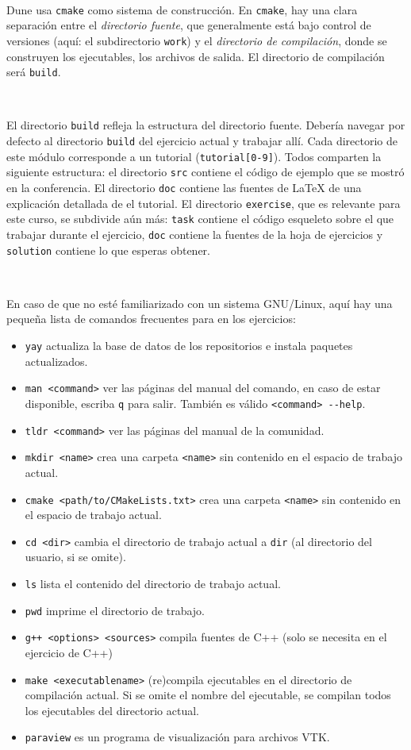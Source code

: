\documentclass[9pt,a3paper]{scrartcl}
\begin{document}
\

Dune usa \verb!cmake! como sistema de construcción.
En \verb!cmake!, hay una clara separación entre el \textit{directorio fuente}, que
generalmente está bajo control de versiones (aquí: el subdirectorio \verb!work!) y el \textit{directorio de compilación}, donde se construyen los ejecutables, los archivos de salida. El directorio de compilación será \verb!build!.

\

El directorio \verb!build! refleja la estructura del directorio fuente.
Debería navegar por defecto al directorio \verb!build! del ejercicio actual y trabajar allí.
Cada directorio de este módulo corresponde a un tutorial (\verb!tutorial[0-9]!).
Todos comparten la siguiente estructura: el directorio \verb!src! contiene el
código de ejemplo que se mostró en la conferencia.
El directorio \verb!doc! contiene las fuentes de \LaTeX{} de una explicación detallada de
el tutorial.
El directorio \verb!exercise!, que es relevante para este curso, se subdivide aún más: \verb!task! contiene el código esqueleto sobre el que trabajar durante el ejercicio, \verb!doc! contiene la fuentes de la hoja de ejercicios y \verb!solution! contiene lo que esperas obtener.

\

En caso de que no esté familiarizado con un sistema GNU/Linux, aquí hay una pequeña lista de comandos frecuentes para en los ejercicios:
\begin{itemize}
	\item \verb!yay! actualiza la base de datos de los repositorios e instala paquetes actualizados.

	\item \verb!man <command>! ver las páginas del manual del comando, en caso de estar disponible, escriba \verb!q! para salir. También es válido \verb!<command> --help!.
	\item \verb!tldr <command>! ver las páginas del manual de la comunidad.
	\item \verb!mkdir <name>! crea una carpeta \verb!<name>! sin contenido en el espacio de trabajo actual.
	\item \verb!cmake <path/to/CMakeLists.txt>! crea una carpeta \verb!<name>! sin contenido en el espacio de trabajo actual.
	\item \verb!cd <dir>! cambia el directorio de trabajo actual
	      a \verb!dir! (al directorio del usuario, si se omite).
	\item \verb!ls! lista el contenido del directorio de trabajo actual.
	\item \verb!pwd! imprime el directorio de trabajo.
	\item \verb!g++ <options> <sources>! compila fuentes de C++ (solo se necesita en el ejercicio de C++)
	\item \verb!make <executablename>! (re)compila ejecutables en el directorio de compilación actual. Si se omite el nombre del ejecutable, se compilan todos los ejecutables del directorio actual.
	\item \verb!paraview! es un programa de visualización para archivos VTK.
\end{itemize}
\end{document}
